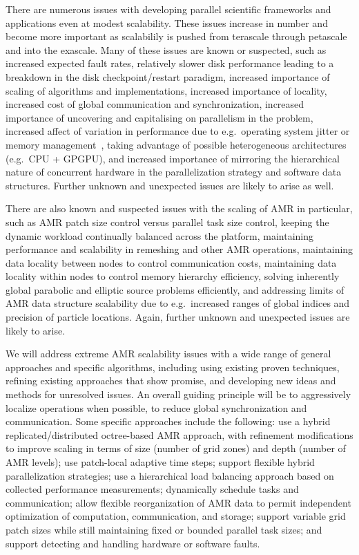 \documentclass[10pt,twocolumn]{article}
\begin{document}
There are numerous issues with developing parallel scientific
frameworks and applications even at modest scalability.  These issues
increase in number and become more important as scalabilily is pushed
from terascale through petascale and into the exascale.  Many of these
issues are known or suspected, such as increased expected fault rates,
relatively slower disk performance leading to a breakdown in the disk
checkpoint/restart paradigm, increased importance of scaling of
algorithms and implementations, increased importance of locality,
increased cost of global communication and synchronization, increased
importance of uncovering and capitalising on parallelism in the
problem, increased affect of variation in performance due to
e.g.~operating system jitter or memory management~\cite{StSh09},
taking advantage of possible heterogeneous architectures (e.g.~CPU +
GPGPU), and increased importance of mirroring the hierarchical nature
of concurrent hardware in the parallelization strategy and software
data structures.  Further unknown and unexpected issues are likely to
arise as well.

There are also known and suspected issues with the scaling of AMR in
particular, such as AMR patch size control versus parallel task size
control, keeping the dynamic workload continually balanced across the
platform, maintaining performance and scalability in remeshing and
other AMR operations, maintaining data locality between nodes to
control communication costs, maintaining data locality within nodes to
control memory hierarchy efficiency, solving inherently global
parabolic and elliptic source problems efficiently, and addressing
limits of AMR data structure scalability due to e.g.~increased ranges
of global indices and precision of particle locations.  Again, further
unknown and unexpected issues are likely to arise.

We will address extreme AMR scalability issues with a wide range of
general approaches and specific algorithms, including using existing
proven techniques, refining existing approaches that show promise, and
developing new ideas and methods for unresolved issues.
%
An overall guiding principle will be to aggressively localize
operations when possible, to reduce global synchronization and
communication.
%
Some specific approaches include the following: 
%
use a hybrid replicated/distributed octree-based AMR approach, with
refinement modifications to improve scaling in terms of size (number
of grid zones) and depth (number of AMR levels);
%
use patch-local adaptive time steps;
%
support flexible hybrid parallelization strategies;
%
use a hierarchical load balancing approach based on collected performance measurements; 
%
dynamically schedule tasks and communication;
%
allow flexible reorganization of AMR data to permit independent
optimization of computation, communication, and storage;
%
support variable grid patch sizes while still maintaining fixed or
bounded parallel task sizes;
%
and support detecting and handling hardware or software faults.
\end{document}
